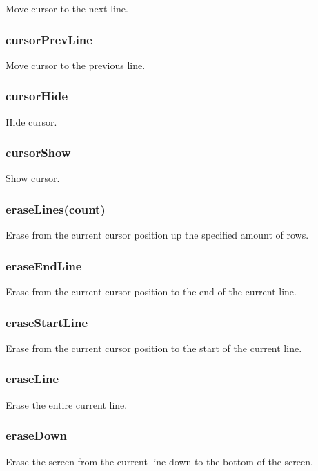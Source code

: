 Move cursor to the next line.

\subsubsection*{cursor\+Prev\+Line}

Move cursor to the previous line.

\subsubsection*{cursor\+Hide}

Hide cursor.

\subsubsection*{cursor\+Show}

Show cursor.

\subsubsection*{erase\+Lines(count)}

Erase from the current cursor position up the specified amount of rows.

\subsubsection*{erase\+End\+Line}

Erase from the current cursor position to the end of the current line.

\subsubsection*{erase\+Start\+Line}

Erase from the current cursor position to the start of the current line.

\subsubsection*{erase\+Line}

Erase the entire current line.

\subsubsection*{erase\+Down}

Erase the screen from the current line down to the bottom of the screen.

